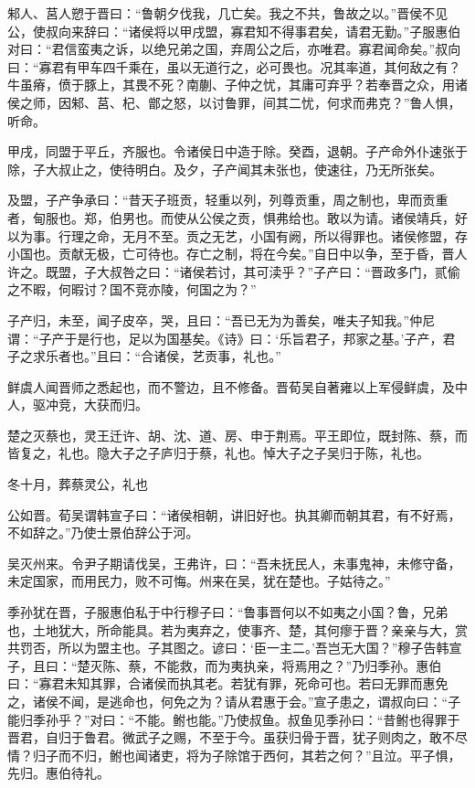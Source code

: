 \documentclass[a4paper,12pt,UTF8,twoside]{ctexbook}
\begin{document}
邾人、莒人愬于晋曰：“鲁朝夕伐我，几亡矣。我之不共，鲁故之以。”晋侯不见公，使叔向来辞曰：“诸侯将以甲戌盟，寡君知不得事君矣，请君无勤。”子服惠伯对曰：“君信蛮夷之诉，以绝兄弟之国，弃周公之后，亦唯君。寡君闻命矣。”叔向曰：“寡君有甲车四千乘在，虽以无道行之，必可畏也。况其率道，其何敌之有？牛虽瘠，偾于豚上，其畏不死？南蒯、子仲之忧，其庸可弃乎？若奉晋之众，用诸侯之师，因邾、莒、杞、鄫之怒，以讨鲁罪，间其二忧，何求而弗克？”鲁人惧，听命。

甲戌，同盟于平丘，齐服也。令诸侯日中造于除。癸酉，退朝。子产命外仆速张于除，子大叔止之，使待明白。及夕，子产闻其未张也，使速往，乃无所张矣。

及盟，子产争承曰：“昔天子班贡，轻重以列，列尊贡重，周之制也，卑而贡重者，甸服也。郑，伯男也。而使从公侯之贡，惧弗给也。敢以为请。诸侯靖兵，好以为事。行理之命，无月不至。贡之无艺，小国有阙，所以得罪也。诸侯修盟，存小国也。贡献无极，亡可待也。存亡之制，将在今矣。”自日中以争，至于昏，晋人许之。既盟，子大叔咎之曰：“诸侯若讨，其可渎乎？”子产曰：“晋政多门，贰偷之不暇，何暇讨？国不竞亦陵，何国之为？”

子产归，未至，闻子皮卒，哭，且曰：“吾已无为为善矣，唯夫子知我。”仲尼谓：“子产于是行也，足以为国基矣。《诗》曰：‘乐旨君子，邦家之基。’子产，君子之求乐者也。”且曰：“合诸侯，艺贡事，礼也。”

鲜虞人闻晋师之悉起也，而不警边，且不修备。晋荀吴自著雍以上军侵鲜虞，及中人，驱冲竞，大获而归。

楚之灭蔡也，灵王迁许、胡、沈、道、房、申于荆焉。平王即位，既封陈、蔡，而皆复之，礼也。隐大子之子庐归于蔡，礼也。悼大子之子吴归于陈，礼也。

冬十月，葬蔡灵公，礼也

公如晋。荀吴谓韩宣子曰：“诸侯相朝，讲旧好也。执其卿而朝其君，有不好焉，不如辞之。”乃使士景伯辞公于河。

吴灭州来。令尹子期请伐吴，王弗许，曰：“吾未抚民人，未事鬼神，未修守备，未定国家，而用民力，败不可悔。州来在吴，犹在楚也。子姑待之。”

季孙犹在晋，子服惠伯私于中行穆子曰：“鲁事晋何以不如夷之小国？鲁，兄弟也，土地犹大，所命能具。若为夷弃之，使事齐、楚，其何瘳于晋？亲亲与大，赏共罚否，所以为盟主也。子其图之。谚曰：‘臣一主二。’吾岂无大国？”穆子告韩宣子，且曰：“楚灭陈、蔡，不能救，而为夷执亲，将焉用之？”乃归季孙。惠伯曰：“寡君未知其罪，合诸侯而执其老。若犹有罪，死命可也。若曰无罪而惠免之，诸侯不闻，是逃命也，何免之为？请从君惠于会。”宣子患之，谓叔向曰：“子能归季孙乎？”对曰：“不能。鲋也能。”乃使叔鱼。叔鱼见季孙曰：“昔鲋也得罪于晋君，自归于鲁君。微武子之赐，不至于今。虽获归骨于晋，犹子则肉之，敢不尽情？归子而不归，鲋也闻诸吏，将为子除馆于西何，其若之何？”且泣。平子惧，先归。惠伯待礼。
\end{document}
